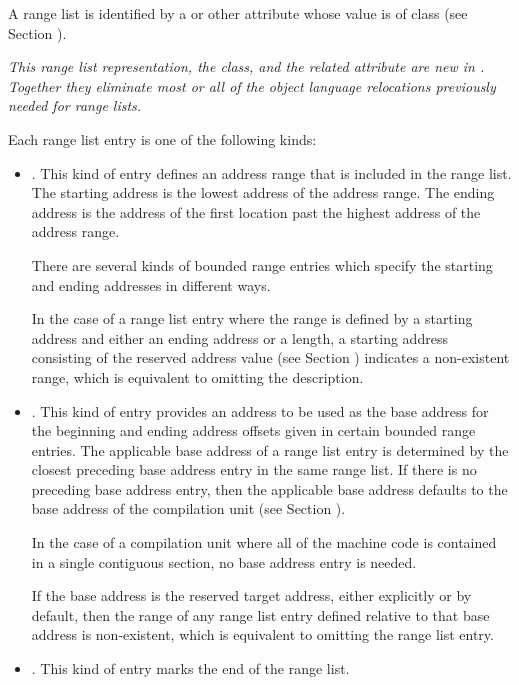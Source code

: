 A range list is identified by a \DWATranges{} 
or other attribute whose value is of class \CLASSrnglist{} 
(see Section ).
 
\textit{This range list representation, the \CLASSrnglist{} class, and the
related \DWATrnglistsbase{} attribute are new in \DWARFVersionV.
Together they eliminate most or all of the object language relocations
previously needed for range lists.}

Each range list entry is one of the following kinds:
\begin{itemize}
\item {}. 
\label{text:bndrng}
\bbeb
This kind of entry defines an address range
that is included in the range list. The starting address is
the lowest address of the address range. The ending address
is the address of the first location past the highest address
of the address range.
       
There are several kinds of bounded range entries which specify
the starting and ending addresses in different ways.

\bb
In the case of a range list entry where the range is defined by a
starting address and either an ending address or a length, a starting
address consisting of the reserved address value (see Section 
)
indicates a non-existent range, which is equivalent to omitting the
description.
\eb

\item {}.
This kind of entry provides an address to be
used as the base address for the beginning and ending
address offsets given in certain bounded range entries. The
applicable base address of a range list entry is
determined by the closest preceding base address
entry in the same range list. If there is no preceding
base address entry, then the applicable base address
defaults to the base address of the compilation unit (see 
Section ).

In the case of a compilation unit where all of the machine
code is contained in a single contiguous section, no base
address entry is needed.

\bb
If the base address is the reserved target address, either explicitly or
by default, then the range of any range list entry defined relative to
that base address is non-existent, which is equivalent to omitting the
range list entry.
\eb

\item {}. 
This kind of entry marks the end of the range list.

\end{itemize}

